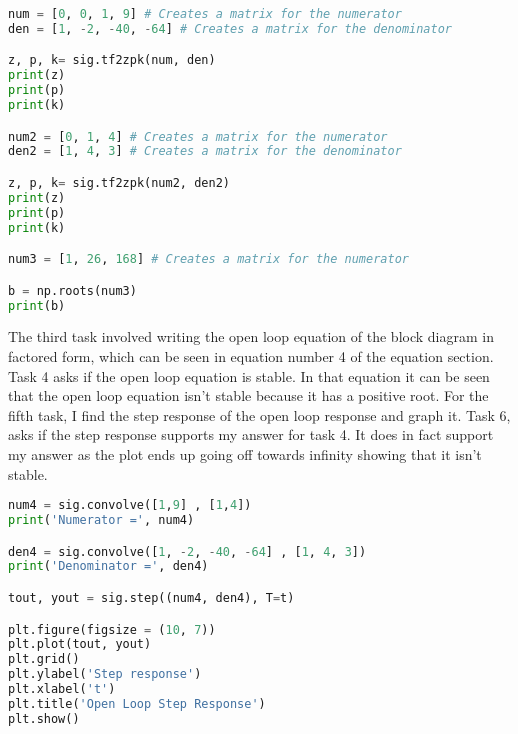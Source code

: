\documentclass[12pt]{report}
\begin{document}
\begin{lstlisting}[language=Python]
num = [0, 0, 1, 9] # Creates a matrix for the numerator
den = [1, -2, -40, -64] # Creates a matrix for the denominator

z, p, k= sig.tf2zpk(num, den)
print(z)
print(p)
print(k)

num2 = [0, 1, 4] # Creates a matrix for the numerator
den2 = [1, 4, 3] # Creates a matrix for the denominator

z, p, k= sig.tf2zpk(num2, den2)
print(z)
print(p)
print(k)

num3 = [1, 26, 168] # Creates a matrix for the numerator

b = np.roots(num3)
print(b)
\end{lstlisting}
The third task involved writing the open loop equation of the block diagram
in factored form, which can be seen in equation number 4 of the equation
section. Task 4 asks if the open loop equation is stable.
In that equation it can be seen that the open loop equation isn't stable
because it has a positive root. For the fifth task, I find the step
response of the open loop response and graph it. Task 6, asks if the
step response supports my answer for task 4. It does in fact support my
answer as the plot ends up going off towards infinity showing that it isn't
stable.
\begin{lstlisting}[language=Python]
num4 = sig.convolve([1,9] , [1,4])
print('Numerator =', num4)

den4 = sig.convolve([1, -2, -40, -64] , [1, 4, 3])
print('Denominator =', den4)

tout, yout = sig.step((num4, den4), T=t)

plt.figure(figsize = (10, 7))
plt.plot(tout, yout)
plt.grid()
plt.ylabel('Step response')
plt.xlabel('t')
plt.title('Open Loop Step Response')
plt.show()
\end{lstlisting}
\end{document}
